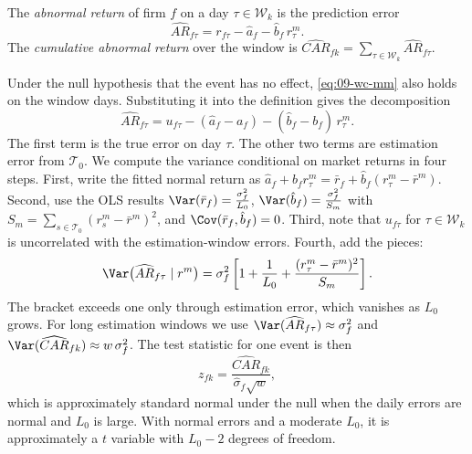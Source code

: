\begin{definition}\label{def:09-wc-ar}
The \emph{abnormal return} of firm $f$ on a day $\tau\in\mathcal{W}_k$ is the prediction error
\begin{equation*}
\widehat{AR}_{f\tau} = r_{f\tau}-\hat a_f-\hat b_f\, r^m_\tau .
\end{equation*}
The \emph{cumulative abnormal return} over the window is
$\widehat{CAR}_{fk}=\sum_{\tau\in\mathcal{W}_k}\widehat{AR}_{f\tau}$.
\end{definition}

Under the null hypothesis that the event has no effect, \eqref{eq:09-wc-mm} also holds on the window
days. Substituting it into the definition gives the decomposition
\begin{equation*}
\widehat{AR}_{f\tau} = u_{f\tau}-(\hat a_f-a_f)-(\hat b_f-b_f)\,r^m_\tau .
\end{equation*}
The first term is the true error on day $\tau$. The other two terms are estimation error from
$\mathcal{T}_0$. We compute the variance conditional on market returns in four steps. First, write the
fitted normal return as $\hat a_f+\hat b_f r^m_\tau=\bar r_f+\hat b_f(r^m_\tau-\bar r^m)$. Second,
use the OLS results $\Var(\bar r_f)=\frac{\sigma_f^2}{L_0}$, $\Var(\hat b_f)=\frac{\sigma_f^2}{S_m}$
with $S_m=\sum_{s\in\mathcal{T}_0}(r^m_s-\bar r^m)^2$, and $\Cov(\bar r_f,\hat b_f)=0$. Third, note that
$u_{f\tau}$ for $\tau\in\mathcal{W}_k$ is uncorrelated with the estimation-window errors. Fourth, add
the pieces:
\begin{equation}\label{eq:09-wc-arvar}
\Var\big(\widehat{AR}_{f\tau}\mid r^m\big)
 = \sigma_f^2\left[1+\frac{1}{L_0}+\frac{(r^m_\tau-\bar r^m)^2}{S_m}\right].
\end{equation}
The bracket exceeds one only through estimation error, which vanishes as $L_0$ grows. For long
estimation windows we use $\Var(\widehat{AR}_{f\tau})\approx\sigma_f^2$ and
$\Var(\widehat{CAR}_{fk})\approx w\,\sigma_f^2$. The test statistic for one event is then
\begin{equation*}
z_{fk}=\frac{\widehat{CAR}_{fk}}{\hat\sigma_f\sqrt{w}},
\end{equation*}
which is approximately standard normal under the null when the daily errors are normal and $L_0$ is
large. With normal errors and a moderate $L_0$, it is approximately a $t$ variable with $L_0-2$ degrees of
freedom.

